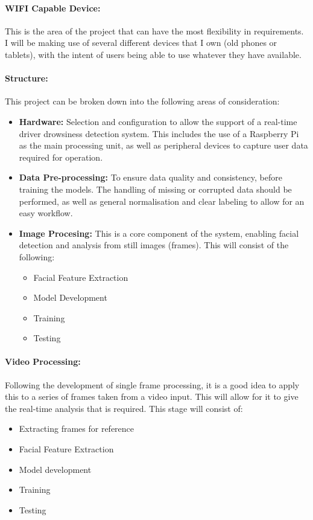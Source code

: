\paragraph{WIFI Capable Device:}
This is the area of the project that can have the most flexibility in requirements. I will be making use of several different devices
that I own (old phones or tablets), with the intent of users being able to use whatever they have available.

\paragraph{Structure:}
This project can be broken down into the following areas of consideration:
\begin{itemize}
    \item \textbf{Hardware:} Selection and configuration to allow the support of a real-time driver drowsiness detection system. This
    includes the use of a Raspberry Pi as the main processing unit, as well as peripheral devices to capture user data required for
    operation.
    \item \textbf{Data Pre-processing:} To ensure data quality and consistency, before training the models. The handling of missing or
    corrupted data should be performed, as well as general normalisation and clear labeling to allow for an easy workflow.
    \item \textbf{Image Procesing:} This is a core component of the system, enabling facial detection and analysis from still images
    (frames). This will consist of the following:
    \begin{itemize}
        \item Facial Feature Extraction
        \item Model Development
        \item Training
        \item Testing
    \end{itemize}
\end{itemize}
\paragraph{Video Processing:}
Following the development of single frame processing, it is a good idea to apply this to a series of frames taken from a video input.
This will allow for it to give the real-time analysis that is required. This stage will consist of:
\begin{itemize}
    \item Extracting frames for reference
    \item Facial Feature Extraction
    \item Model development 
    \item Training
    \item Testing
\end{itemize}

